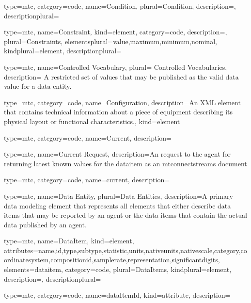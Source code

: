 {
  type=mtc,
  category=code,
  name={Condition},
  plural={Condition},
  description={},
  descriptionplural={}
}


{
  type=mtc,
  name={Constraint},
  kind={element},
  category=code,
  description={},
  plural={Constraints},
  elementsplural={\gls{value},\gls{maximum},\gls{minimum},\gls{nominal}},
  kindplural={element},
  descriptionplural={}
}


{
  type=mtc,
  name={Controlled Vocabulary},
  plural= {Controlled Vocabularies},
  description= {A restricted set of values that may be published as the \gls{valid data value} for a \gls{data entity}.}
}


{
  type=mtc,
  category=code,
  name={Configuration},
  description={An XML element that contains technical information about a piece of equipment describing its physical layout or functional characteristics.},
  kind={element}
}


{
  type=mtc,
  category=code,
  name={Current},
  description={}
}


{
  type=mtc,
  name={Current Request},
  description={An  request to the \gls{agent} for returning latest known values for the \gls{dataitem} as an \glspl{mtconnectstream}  document}
}


{
  type=mtc,
  category=code,
  name={current},
  description={}
}


{
  type=mtc,
  name={Data Entity},
  plural={Data Entities},
  description={A primary data modeling element that represents all elements that either describe data items that may be reported by an \gls{agent} or the data items that contain the actual data published by an \gls{agent}.}
}


{
  type=mtc,
  name={DataItem},
  kind={element},
  attributes={\gls{name},\gls{id},\gls{type},\gls{subtype},\gls{statistic},\gls{units},\gls{nativeunits},\gls{nativescale},\gls{category},\gls{coordinatesystem},\gls{compositionid},\gls{samplerate},\gls{representation},\gls{significantdigits}},
  elements={\gls{dataitem}},
  category=code,
  plural={DataItems},
  kindplural={element},
  description={},
  descriptionplural={}
}


{
  type=mtc,
  category=code,
  name={dataItemId},
  kind={attribute},
  description={}
}


